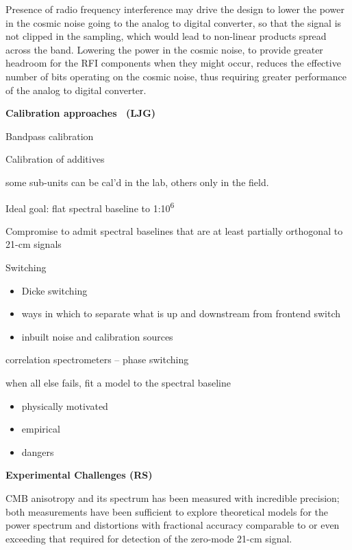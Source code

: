 \begin{itemize}
 Presence of radio frequency interference may drive the design to lower the power in the cosmic noise going to the analog to digital converter, so that the signal is not clipped in the sampling, which would lead to non-linear products spread across the band.  Lowering the power in the cosmic noise, to provide greater headroom for the RFI components when they might occur, reduces the effective number of bits operating on the cosmic noise, thus requiring greater performance of the analog to digital converter.
   
\end{itemize}

\textbf{Calibration approaches{~ }(LJG)}

Bandpass calibration

Calibration of additives

some sub-units can be cal'd in the lab, others only in the field.

Ideal goal: flat spectral baseline to 1:10\textsuperscript{6}{~}

Compromise to admit spectral baselines that are at least partially
orthogonal to 21-cm signals

Switching

\begin{itemize}
\item
  Dicke switching
\item
  ways in which to separate what is up and downstream from frontend
  switch
\item
  inbuilt noise and calibration sources
\end{itemize}

correlation spectrometers -- phase switching

when all else fails, fit a model to the spectral baseline

\begin{itemize}
\item
  physically motivated
\item
  empirical
\item
  dangers
\end{itemize}

\textbf{Experimental Challenges (RS)}

CMB anisotropy and its spectrum has been measured with incredible precision; both measurements have been sufficient to explore theoretical models for the power spectrum and distortions with fractional accuracy comparable to or even exceeding that required for detection of the zero-mode 21-cm signal. 

